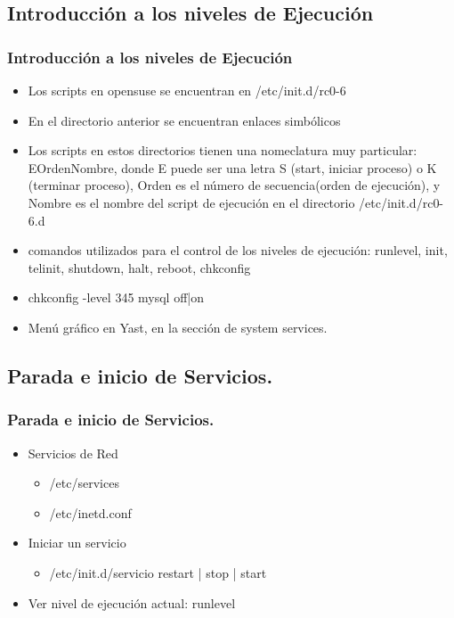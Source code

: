 \documentclass{beamer}
\begin{document}
\subsection{Introducci\'on a los niveles de Ejecuci\'on}
\begin{frame}
\frametitle{Introducci\'on a los niveles de Ejecuci\'on}
\begin{itemize}
\item Los scripts en opensuse se encuentran en /etc/init.d/rc{0-6}
\item En el directorio anterior se encuentran enlaces simb\'olicos
\item Los scripts en estos directorios tienen una nomeclatura muy particular: EOrdenNombre, donde E puede ser una letra S (start, iniciar proceso) o  K (terminar proceso), Orden es el n\'umero de secuencia(orden de ejecuci\'on), y Nombre es el nombre del script de ejecuci\'on en el directorio /etc/init.d/rc{0-6}.d
\item comandos utilizados para el control de los niveles de ejecuci\'on: runlevel, init, telinit, shutdown, halt, reboot, chkconfig
\item chkconfig -level 345 mysql off|on
\item Menú gráfico en Yast, en la sección de system services.
\end{itemize}
\end{frame}

\subsection{Parada  e inicio de Servicios.}
\begin{frame}
\frametitle{Parada  e inicio de Servicios.}
\begin{itemize}
\item Servicios de Red
\begin{itemize}
\item /etc/services
\item /etc/inetd.conf
\end{itemize}
\item Iniciar un servicio
\begin{itemize}
\item /etc/init.d/servicio restart | stop | start 
\end{itemize}
\item Ver nivel de ejecuci\'on actual: runlevel
\end{itemize}
\end{frame}
\end{document}
